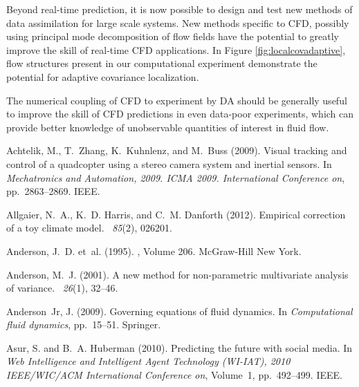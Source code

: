 \documentclass[12pt]{report}
\begin{document}
Beyond real-time prediction, it is now possible to design and test new methods of data assimilation for large scale systems.
New methods specific to CFD, possibly using principal mode decomposition of flow fields have the potential to greatly improve the skill of real-time CFD applications.
In Figure \ref{fig:localcovadaptive}, flow structures present in our computational experiment demonstrate the potential for adaptive covariance localization.

The numerical coupling of CFD to experiment by DA should be generally useful to improve the skill of CFD predictions in even data-poor experiments, which can provide better knowledge of unobservable quantities of interest in fluid flow.


\begin{thebibliography}{}

Achtelik, M., T.~Zhang, K.~Kuhnlenz, and M.~Buss (2009).
\newblock Visual tracking and control of a quadcopter using a stereo camera
  system and inertial sensors.
\newblock In {\em Mechatronics and Automation, 2009. ICMA 2009. International
  Conference on}, pp.\  2863--2869. IEEE.

Allgaier, N.~A., K.~D. Harris, and C.~M. Danforth (2012).
\newblock Empirical correction of a toy climate model.
~{\em 85\/}(2), 026201.

Anderson, J.~D. et~al. (1995).
, Volume 206.
\newblock McGraw-Hill New York.

Anderson, M.~J. (2001).
\newblock A new method for non-parametric multivariate analysis of variance.
~{\em 26\/}(1), 32--46.

Anderson~Jr, J. (2009).
\newblock Governing equations of fluid dynamics.
\newblock In {\em Computational fluid dynamics}, pp.\  15--51. Springer.

Asur, S. and B.~A. Huberman (2010).
\newblock Predicting the future with social media.
\newblock In {\em Web Intelligence and Intelligent Agent Technology (WI-IAT),
  2010 IEEE/WIC/ACM International Conference on}, Volume~1, pp.\  492--499.
  IEEE.


\end{thebibliography}
\end{document}
